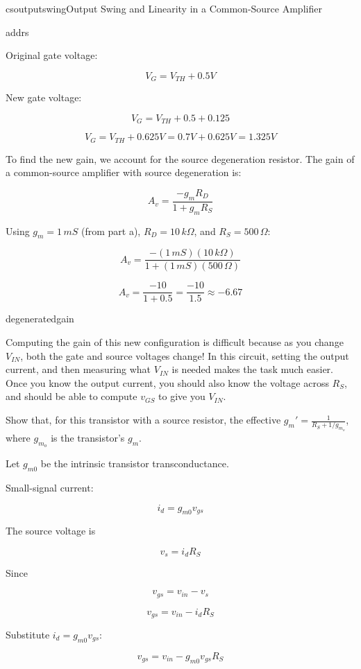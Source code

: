 \begin{mainquestion}{csoutputswing}{Output Swing and Linearity in a Common-Source Amplifier}
\begin{partquestion}{addrs}
\begin{answer}[2.5in]
Original gate voltage:

\[
V_G = V_{TH}+0.5V
\]

New gate voltage:

\[
V_G = V_{TH}+0.5+0.125
\]

\[
V_G = V_{TH}+0.625V = 0.7V + 0.625V = 1.325V
\]

To find the new gain, we account for the source degeneration resistor. The gain of a common-source amplifier with source degeneration is:

\[
A_v = \frac{-g_m R_D}{1 + g_m R_S}
\]

Using $g_m = 1\,mS$ (from part a), $R_D = 10\,k\Omega$, and $R_S = 500\,\Omega$:

\[
A_v = \frac{-(1\,mS)(10\,k\Omega)}{1 + (1\,mS)(500\,\Omega)}
\]

\[
A_v = \frac{-10}{1 + 0.5} = \frac{-10}{1.5} \approx -6.67
\]
\end{answer}

\qnewpage
\end{partquestion}

\begin{partquestion}{degeneratedgain}
{Computing the gain of this new configuration is difficult because as you change $V_{IN}$, both the gate and source voltages change! In this circuit, setting the output current, and then measuring what $V_{IN}$ is needed makes the task much easier.  Once you know the output current, you should also know the voltage across $R_S$, and should be able to compute $v_{GS}$ to give you $V_{IN}$. 

Show that, for this transistor with a source resistor, the effective $g_m'=\frac{1}{R_S+1/g_{m_o}}$, where $g_{m_o}$ is the transistor's $g_m$.}

\begin{answer}[3in]
Let $g_{m0}$ be the intrinsic transistor transconductance.

Small-signal current:

\[
i_d = g_{m0} v_{gs}
\]

The source voltage is

\[
v_s = i_d R_S
\]

Since

\[
v_{gs} = v_{in} - v_s
\]

\[
v_{gs} = v_{in} - i_d R_S
\]

Substitute $i_d=g_{m0}v_{gs}$:

\[
v_{gs} = v_{in} - g_{m0}v_{gs}R_S
\]


\end{answer}
\end{partquestion}
\end{mainquestion}
